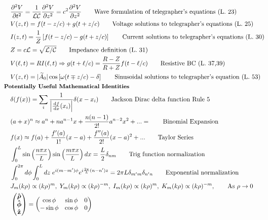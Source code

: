 \documentclass[10pt]{article}
\newcommand{\zhat}{\boldsymbol{\hat{\textbf{z}}}}
\newcommand{\phihat}{\boldsymbol{\hat{\textbf{$\phi$}}}}
\newcommand{\rhohat}{\boldsymbol{\hat{\textbf{$\rho$}}}}
\newcommand{\dd}{\, \mathrm{d}}
\newcommand{\tder}[2]{\frac{\dd #1}{\dd #2}}
\newcommand{\dpder}[2]{\frac{\partial^2 #1}{\partial #2^2}}
\newcommand{\lrb}[1]{\left[ #1 \right]}
\begin{document}
\begin{multicols}{2}
\begin{align*}
		& \dpder{V}{t} = \frac{1}{\mathcal{LC}} \dpder{V}{z} = c^2 \dpder{V}{z} \tag*{Wave formulation of telegrapher's equations (L. 23)} \\
		& V(z,t) = f(t-z/c) + g(t+z/c) \tag*{Voltage solutions to telegrapher's equations (L. 25)} \\
		& I(z,t) = \frac{1}{Z} \lrb{f(t-z/c) - g(t+z/c)} \tag*{Current solutions to telegrapher's equations (L. 30)} \\
		& Z = c \mathcal{L} = \sqrt{\mathcal{L}/\mathcal{C}} \tag*{Impedance definition (L. 31)} \\
		& V(\ell,t) = R I(\ell,t) \Rightarrow g(t+\ell/c) = \frac{R-Z}{R+Z} f(t-\ell/c) \tag*{Resistive BC (L. 37,39)}\\
		& V(z,t) = |\widetilde{A}_0| \cos\lrb{\omega(t \mp z/c) -\delta} \tag*{Sinusoidal solutions to telegrapher's equation (L. 53)} \\
	& \small \hspace{-10pt} \textbf{Potentially Useful Mathematical Identities} \small \\
		& \delta(f(x)) = \sum_{i} \frac{1}{\left|\tder{f}{x}(x_i)\right|}\delta(x - x_i)	\tag*{Jackson Dirac delta function Rule 5 } \\
		& (a + x)^n \approx a^n + n a^{n-1} x + \frac{n (n-1)}{2!} a^{n-2} x^2 + ... =  \tag*{Binomial Expansion} \\
		& f(x) \approx f(a) + \frac{f'(a)}{1!}(x-a) + \frac{f''(a)}{2!}(x-a)^2 + ...  \tag*{Taylor Series} \\
		& \int_{0}^{L} \sin \left( \frac{n \pi x}{L} \right)  \sin \left( \frac{m \pi x}{L} \right) dx = \frac{L}{2} \delta_{nm}  \tag*{Trig function normalization} \\
		& \int_{0}^{2 \pi} d \phi \int_{0}^{L} dz \; e^{i(m - m') \phi} e^{i \frac{2 \pi}{L}(n -n')z} = 2 \pi L \delta_{m'm} \delta_{n'n} \tag*{Exponential normalization} \\
		& J_m(k \rho) \propto (k \rho)^m, \; Y_m(k \rho) \propto (k \rho)^{-m}, \; I_m(k \rho) \propto (k \rho)^m, \; K_m(k \rho) \propto (k \rho)^{-m}, \tag*{As $\rho \rightarrow 0$} \\
 		&\begin{pmatrix}
			\rhohat \\
			\phihat \\
			\zhat
 		\end{pmatrix} =
 		\begin{pmatrix}
 			\cos \phi & \sin \phi & 0 \\
 			-\sin \phi & \cos \phi & 0 \\

\end{pmatrix}
\end{align*}
\end{multicols}
\end{document}
